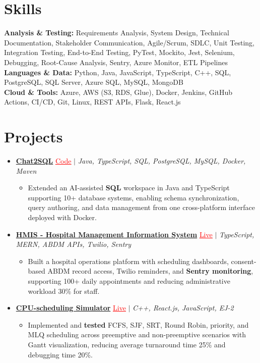 \documentclass[letterpaper,10pt]{article}
\newcommand{\itemTail}{\vspace{-4pt}}
\newcommand{\sectionGap}{\vspace{-8pt}}
\newcommand{\projGap}{\vspace{3pt}}
\newcommand{\resumeItem}[1]{\item\small{{#1 \itemTail}}}
\newcommand{\resumeProjectHeading}[1]{\item \small #1 \vspace{-2pt}}
\newcommand{\resumeProjectLink}[2]{\href{#1}{\textcolor{red}{\underline{#2}}}}
\newcommand{\resumeSubHeadingListStart}{\begin{itemize}[leftmargin=0.0in, label={}]}
\newcommand{\resumeSubHeadingListEnd}{\end{itemize}}
\newcommand{\resumeProjItemListStart}{\begin{itemize}[leftmargin=0.15in,label=\textbullet,itemsep=3pt,topsep=0pt,parsep=0pt,partopsep=0pt]}
\newcommand{\resumeProjItemListEnd}{\end{itemize}\vspace{-4pt}}
\begin{document}
\section{Skills}
\begin{itemize}[leftmargin=0.15in, label={}]
\small{\item{
\textbf{Analysis \& Testing:} Requirements Analysis, System Design, Technical Documentation, Stakeholder Communication, Agile/Scrum, SDLC, Unit Testing, Integration Testing, End-to-End Testing, PyTest, Mockito, Jest, Selenium, Debugging, Root-Cause Analysis, Sentry, Azure Monitor, ETL Pipelines \\
\textbf{Languages \& Data:} Python, Java, JavaScript, TypeScript, C++, SQL, PostgreSQL, SQL Server, Azure SQL, MySQL, MongoDB \\
\textbf{Cloud \& Tools:} Azure, AWS (S3, RDS, Glue), Docker, Jenkins, GitHub Actions, CI/CD, Git, Linux, REST APIs, Flask, React.js
}}
\end{itemize}
\sectionGap
\section{Projects}
\resumeSubHeadingListStart
\vspace{-2pt}
\resumeProjectHeading{\href{https://github.com/SAHAJ-BHADJA/Chat2SQL}{\textbf{Chat2SQL}} \resumeProjectLink{https://github.com/SAHAJ-BHADJA/Chat2SQL}{Code} $|$ \emph{Java, TypeScript, SQL, PostgreSQL, MySQL, Docker, Maven}}
\resumeProjItemListStart
\resumeItem{Extended an AI-assisted \textbf{SQL} workspace in Java and TypeScript supporting 10+ database systems, enabling schema synchronization, query authoring, and data management from one cross-platform interface deployed with Docker.}
\resumeProjItemListEnd
\projGap
\resumeProjectHeading{\href{https://hims-rouge.vercel.app/}{\textbf{HMIS - Hospital Management Information System}} \resumeProjectLink{https://hims-rouge.vercel.app/}{Live} $|$ \emph{TypeScript, MERN, ABDM APIs, Twilio, Sentry}}
\resumeProjItemListStart
\resumeItem{Built a hospital operations platform with scheduling dashboards, consent-based ABDM record access, Twilio reminders, and \textbf{Sentry monitoring}, supporting 100+ daily appointments and reducing administrative workload 30\% for staff.}
\resumeProjItemListEnd
\projGap
\resumeProjectHeading{\href{https://cpu-scheduler-amber.vercel.app/}{\textbf{CPU-scheduling Simulator}} \resumeProjectLink{https://cpu-scheduler-amber.vercel.app/}{Live} $|$ \emph{C++, React.js, JavaScript, EJ-2}}
\resumeProjItemListStart
\resumeItem{Implemented and \textbf{tested} FCFS, SJF, SRT, Round Robin, priority, and MLQ scheduling across preemptive and non-preemptive scenarios with Gantt visualization, reducing average turnaround time 25\% and debugging time 20\%.}
\resumeProjItemListEnd
\resumeSubHeadingListEnd
\end{document}
